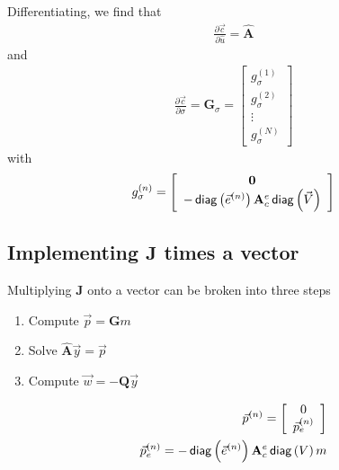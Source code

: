 \documentclass[]{article}
\newcommand{\Ace}{{\mathbf A_c^e}}
\newcommand{\diag}[1]{\,{\sf diag}\left( #1 \right)}
\newcommand {\e}  { {\vec e} }
\begin{document}
Differentiating, we find that
\begin{align}
    \frac{\partial \vec{c}}{\partial \hat{u}} = \hat{\mathbf{A}}
\end{align}
and
\begin{align}
    \frac{\partial \vec{c}}{\partial \sigma} = \mathbf{G}_\sigma =
    \left[
        \begin{array}{c}
            g_\sigma^{(1)}\\
            g_\sigma^{(2)}\\
            \vdots \\
            g_\sigma^{(N)}
        \end{array}
    \right]
\end{align}
with
\begin{subequations}
    \begin{align}
        g_\sigma^{(n)} =
        \left[
            \begin{array}{c}
                \mathbf{0} \\
                - \diag{\e^{(n)}} \Ace \diag{\vec{V}}
            \end{array}
        \right]
    \end{align}
\end{subequations}

\subsection{Implementing $\mathbf{J}$ times a vector}
Multiplying $\mathbf{J}$ onto a vector can be broken into three steps
\begin{enumerate}
\item Compute $\vec{p} = \mathbf{G}m$
\item Solve $\hat{\mathbf{A}} \vec{y} = \vec{p}$
\item Compute $\vec{w} = -\mathbf{Q} \vec{y}$
\end{enumerate}

\begin{subequations}
    \begin{align}
        \vec{p}^{(n)} = \left[
            \begin{array}{c}
                0 \\
                \vec{p}_e^{(n)}
            \end{array}
        \right] \\
        \vec{p}_e^{(n)} = - \diag{\e^{(n)}} \Ace \diag{V} m
    \end{align}
\end{subequations}
\end{document}
